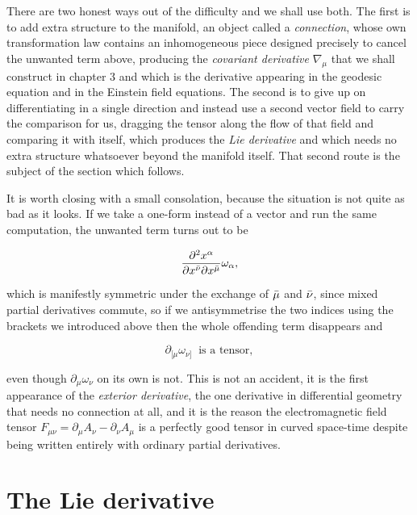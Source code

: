         There are two honest ways out of the difficulty and we shall use both. The first is to add extra structure to the manifold, an object called a \textit{connection}, whose own transformation law contains an inhomogeneous piece designed precisely to cancel the unwanted term above, producing the \textit{covariant derivative} $\nabla_{\mu}$ that we shall construct in chapter 3 and which is the derivative appearing in the geodesic equation and in the Einstein field equations. The second is to give up on differentiating in a single direction and instead use a second vector field to carry the comparison for us, dragging the tensor along the flow of that field and comparing it with itself, which produces the \textit{Lie derivative} and which needs no extra structure whatsoever beyond the manifold itself. That second route is the subject of the section which follows.

        It is worth closing with a small consolation, because the situation is not quite as bad as it looks. If we take a one-form instead of a vector and run the same computation, the unwanted term turns out to be

        \begin{equation}
            \frac{\partial^2 x^{\alpha}}{\partial x^{\Bar{\nu}}\partial x^{\Bar{\mu}}}\omega_{\alpha},
        \end{equation}

        which is manifestly symmetric under the exchange of $\Bar{\mu}$ and $\Bar{\nu}$, since mixed partial derivatives commute, so if we antisymmetrise the two indices using the brackets we introduced above then the whole offending term disappears and

        \begin{equation}
            \partial_{[\mu}\omega_{\nu]} \;\;\text{is a tensor},
        \end{equation}

        even though $\partial_{\mu}\omega_{\nu}$ on its own is not. This is not an accident, it is the first appearance of the \textit{exterior derivative}, the one derivative in differential geometry that needs no connection at all, and it is the reason the electromagnetic field tensor $F_{\mu\nu} = \partial_{\mu}A_{\nu} - \partial_{\nu}A_{\mu}$ is a perfectly good tensor in curved space-time despite being written entirely with ordinary partial derivatives.

\section{The Lie derivative}

